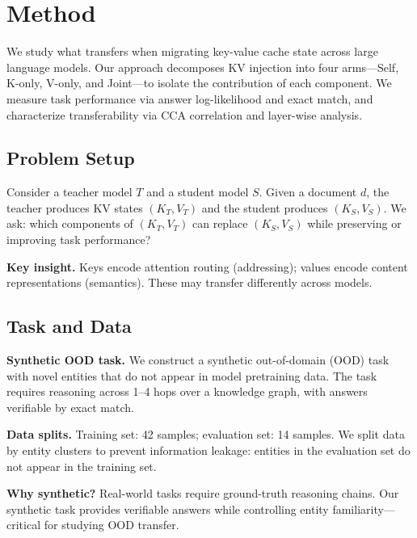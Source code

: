 
\section{Method}
\label{sec:method}

We study what transfers when migrating key-value cache state across large language models.
Our approach decomposes KV injection into four arms---Self, K-only, V-only, and Joint---to isolate the contribution of each component.
We measure task performance via answer log-likelihood and exact match,
and characterize transferability via CCA correlation and layer-wise analysis.

\subsection{Problem Setup}

Consider a teacher model $T$ and a student model $S$.
Given a document $d$, the teacher produces KV states $(K_T, V_T)$
and the student produces $(K_S, V_S)$.
We ask: which components of $(K_T, V_T)$ can replace $(K_S, V_S)$
while preserving or improving task performance?

\textbf{Key insight.} Keys encode attention routing (addressing);
values encode content representations (semantics).
These may transfer differently across models.

\subsection{Task and Data}

\textbf{Synthetic OOD task.}
We construct a synthetic out-of-domain (OOD) task with novel entities
that do not appear in model pretraining data.
The task requires reasoning across 1--4 hops over a knowledge graph,
with answers verifiable by exact match.

\textbf{Data splits.}
Training set: 42 samples; evaluation set: 14 samples.
We split data by entity clusters to prevent information leakage:
entities in the evaluation set do not appear in the training set.

\textbf{Why synthetic?}
Real-world tasks require ground-truth reasoning chains.
Our synthetic task provides verifiable answers while controlling
entity familiarity---critical for studying OOD transfer.

